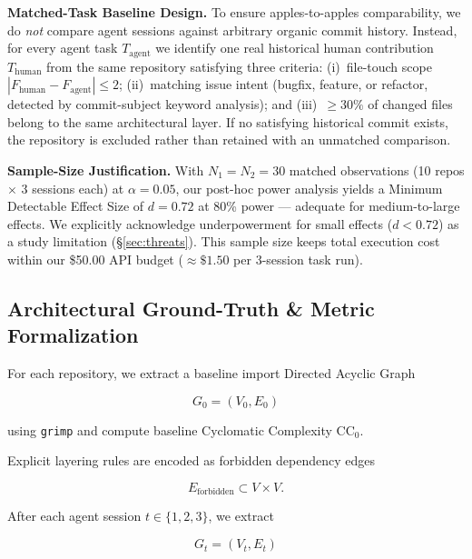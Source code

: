 \documentclass[11pt]{article}
\newcommand{\CC}{\mathrm{CC}}
\begin{document}
\textbf{Matched-Task Baseline Design.}
To ensure apples-to-apples comparability, we do \emph{not} compare
agent sessions against arbitrary organic commit history. Instead, for
every agent task $T_{\text{agent}}$ we identify one real historical
human contribution $T_{\text{human}}$ from the same repository
satisfying three criteria: (i)~file-touch scope $|F_{\text{human}} -
F_{\text{agent}}| \le 2$; (ii)~matching issue intent (bugfix, feature,
or refactor, detected by commit-subject keyword analysis); and
(iii)~$\ge 30\%$ of changed files belong to the same architectural
layer. If no satisfying historical commit exists, the repository is
excluded rather than retained with an unmatched comparison.

\textbf{Sample-Size Justification.}
With $N_{1} = N_{2} = 30$ matched observations (10 repos $\times$ 3
sessions each) at $\alpha = 0.05$, our post-hoc power analysis yields a
Minimum Detectable Effect Size of $d = 0.72$ at 80\% power --- adequate
for medium-to-large effects. We explicitly acknowledge underpowerment
for small effects ($d < 0.72$) as a study limitation (\S\ref{sec:threats}).
This sample size keeps total execution cost within our \$50.00 API
budget ($\approx\$1.50$ per 3-session task run).


\subsection{Architectural Ground-Truth \& Metric Formalization}
\label{sec:ground-truth}

For each repository, we extract a baseline import Directed Acyclic
Graph

\begin{equation}
    G_0=(V_0,E_0)
\end{equation}

using \texttt{grimp} and compute baseline Cyclomatic Complexity
$\CC_0$.

Explicit layering rules are encoded as forbidden dependency edges

\begin{equation}
    E_{\mathrm{forbidden}}
    \subset V\times V.
\end{equation}

After each agent session
$t\in\{1,2,3\}$, we extract

\begin{equation}
    G_t=(V_t,E_t)
\end{equation}
\end{document}
